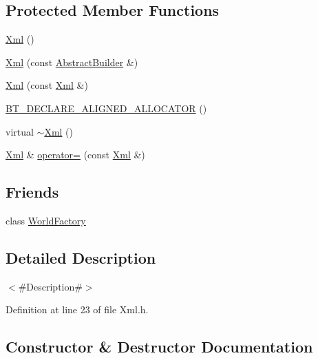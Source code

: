 \subsection*{Protected Member Functions}
\begin{DoxyCompactItemize}
\item 
\mbox{\hyperlink{classnjli_1_1_xml_a15ff5ffe5ebd69a06625f9fefcc02ac5}{Xml}} ()
\item 
\mbox{\hyperlink{classnjli_1_1_xml_a8986e8e3e9835d76295a9834a66a58fa}{Xml}} (const \mbox{\hyperlink{classnjli_1_1_abstract_builder}{Abstract\+Builder}} \&)
\item 
\mbox{\hyperlink{classnjli_1_1_xml_abda0af05e4c99f0c0826e2b4684a21f2}{Xml}} (const \mbox{\hyperlink{classnjli_1_1_xml}{Xml}} \&)
\item 
\mbox{\hyperlink{classnjli_1_1_xml_ac73a8aacfe51e9bf35daca96d5bbf11f}{B\+T\+\_\+\+D\+E\+C\+L\+A\+R\+E\+\_\+\+A\+L\+I\+G\+N\+E\+D\+\_\+\+A\+L\+L\+O\+C\+A\+T\+OR}} ()
\item 
virtual \mbox{\hyperlink{classnjli_1_1_xml_a521d51fdb074abffaa1b1627a034b59a}{$\sim$\+Xml}} ()
\item 
\mbox{\hyperlink{classnjli_1_1_xml}{Xml}} \& \mbox{\hyperlink{classnjli_1_1_xml_a27ce4467c6b7fde48d622df0f1bb9c8e}{operator=}} (const \mbox{\hyperlink{classnjli_1_1_xml}{Xml}} \&)
\end{DoxyCompactItemize}
\subsection*{Friends}
\begin{DoxyCompactItemize}
\item 
class \mbox{\hyperlink{classnjli_1_1_xml_acb96ebb09abe8f2a37a915a842babfac}{World\+Factory}}
\end{DoxyCompactItemize}


\subsection{Detailed Description}
$<$\#\+Description\#$>$ 

Definition at line 23 of file Xml.\+h.



\subsection{Constructor \& Destructor Documentation}
\mbox{\label{classnjli_1_1_xml_a15ff5ffe5ebd69a06625f9fefcc02ac5}} 
